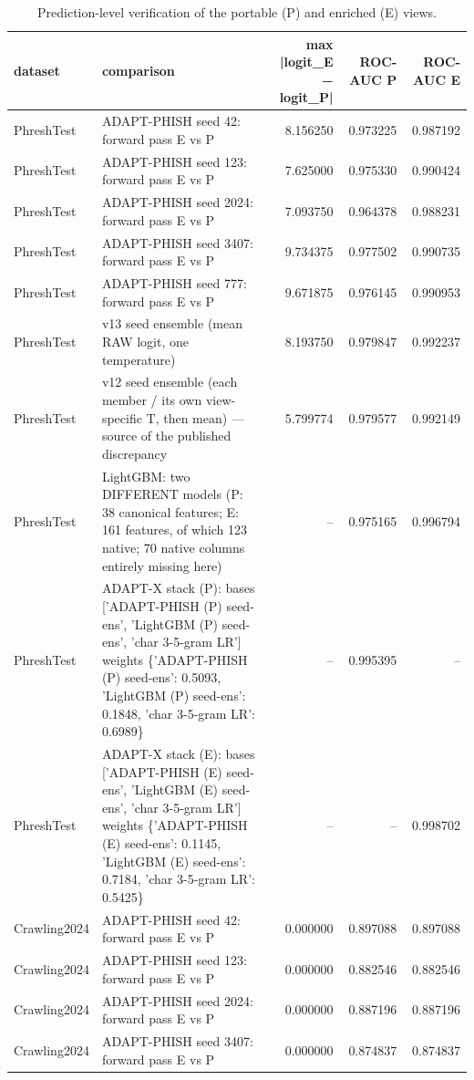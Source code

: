 \begin{table}[t]
\centering
\scriptsize
\caption{Prediction-level verification of the portable (P) and enriched (E) views.}
\label{tab:rev_R2_table8_prediction_level_verification}
\begin{tabular}{llrrr}
\toprule
dataset & comparison & max |logit\_E − logit\_P| & ROC-AUC P & ROC-AUC E \\
\midrule
PhreshTest & ADAPT-PHISH seed 42: forward pass E vs P & 8.156250 & 0.973225 & 0.987192 \\
PhreshTest & ADAPT-PHISH seed 123: forward pass E vs P & 7.625000 & 0.975330 & 0.990424 \\
PhreshTest & ADAPT-PHISH seed 2024: forward pass E vs P & 7.093750 & 0.964378 & 0.988231 \\
PhreshTest & ADAPT-PHISH seed 3407: forward pass E vs P & 9.734375 & 0.977502 & 0.990735 \\
PhreshTest & ADAPT-PHISH seed 777: forward pass E vs P & 9.671875 & 0.976145 & 0.990953 \\
PhreshTest & v13 seed ensemble (mean RAW logit, one temperature) & 8.193750 & 0.979847 & 0.992237 \\
PhreshTest & v12 seed ensemble (each member / its own view-specific T, then mean) — source of the published discrepancy & 5.799774 & 0.979577 & 0.992149 \\
PhreshTest & LightGBM: two DIFFERENT models (P: 38 canonical features; E: 161 features, of which 123 native; 70 native columns entirely missing here) & -- & 0.975165 & 0.996794 \\
PhreshTest & ADAPT-X stack (P): bases ['ADAPT-PHISH (P) seed-ens', 'LightGBM (P) seed-ens', 'char 3-5-gram LR'] weights \{'ADAPT-PHISH (P) seed-ens': 0.5093, 'LightGBM (P) seed-ens': 0.1848, 'char 3-5-gram LR': 0.6989\} & -- & 0.995395 & -- \\
PhreshTest & ADAPT-X stack (E): bases ['ADAPT-PHISH (E) seed-ens', 'LightGBM (E) seed-ens', 'char 3-5-gram LR'] weights \{'ADAPT-PHISH (E) seed-ens': 0.1145, 'LightGBM (E) seed-ens': 0.7184, 'char 3-5-gram LR': 0.5425\} & -- & -- & 0.998702 \\
Crawling2024 & ADAPT-PHISH seed 42: forward pass E vs P & 0.000000 & 0.897088 & 0.897088 \\
Crawling2024 & ADAPT-PHISH seed 123: forward pass E vs P & 0.000000 & 0.882546 & 0.882546 \\
Crawling2024 & ADAPT-PHISH seed 2024: forward pass E vs P & 0.000000 & 0.887196 & 0.887196 \\
Crawling2024 & ADAPT-PHISH seed 3407: forward pass E vs P & 0.000000 & 0.874837 & 0.874837 \\

\end{tabular}
\end{table}
